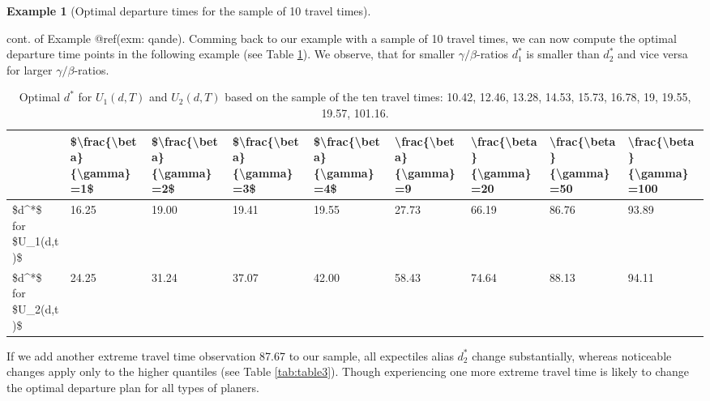 \documentclass[
]{article}
\theoremstyle{definition}
\theoremstyle{definition}
\newtheorem{example}{Example}[section]
\theoremstyle{definition}
\theoremstyle{definition}
\theoremstyle{remark}
\begin{document}
\begin{example}[Optimal departure times for the sample of 10 travel times]
\protect\hypertarget{exm:optd}{}\label{exm:optd}

cont. of Example @ref(exm: qande). Comming back to our example with a sample of 10 travel times, we can now compute the optimal departure time points in the following example (see Table \ref{tab:table1}). We observe, that for smaller \(\gamma/\beta\)-ratios \(d_1^*\) is smaller than \(d_2^*\) and vice versa for larger \(\gamma/\beta\)-ratios.

\begin{table}

\caption{\label{tab:table1}Optimal $d^*$ for $U_1(d,T)$ and $U_2(d,T)$ based on the sample of the ten travel times: 10.42, 12.46, 13.28, 14.53, 15.73, 16.78, 19, 19.55, 19.57, 101.16.}
\centering
\begin{tabular}[t]{l|l|l|l|l|l|l|l|l}
\hline
  & \$\textbackslash{}frac\{\textbackslash{}beta\}\{\textbackslash{}gamma\}=1\$ & \$\textbackslash{}frac\{\textbackslash{}beta\}\{\textbackslash{}gamma\}=2\$ & \$\textbackslash{}frac\{\textbackslash{}beta\}\{\textbackslash{}gamma\}=3\$ & \$\textbackslash{}frac\{\textbackslash{}beta\}\{\textbackslash{}gamma\}=4\$ & \textbackslash{}frac\{\textbackslash{}beta\}\{\textbackslash{}gamma\}=9 & \textbackslash{}frac\{\textbackslash{}beta\}\{\textbackslash{}gamma\}=20 & \textbackslash{}frac\{\textbackslash{}beta\}\{\textbackslash{}gamma\}=50 & \textbackslash{}frac\{\textbackslash{}beta\}\{\textbackslash{}gamma\}=100\\
\hline
\$d\textasciicircum{}*\$ for \$U\_1(d,t)\$ & 16.25 & 19.00 & 19.41 & 19.55 & 27.73 & 66.19 & 86.76 & 93.89\\
\hline
\$d\textasciicircum{}*\$ for \$U\_2(d,t)\$ & 24.25 & 31.24 & 37.07 & 42.00 & 58.43 & 74.64 & 88.13 & 94.11\\
\hline
\end{tabular}
\end{table}

If we add another extreme travel time observation 87.67 to our sample, all expectiles alias \(d^*_2\) change substantially, whereas noticeable changes apply only to the higher quantiles (see Table \ref{tab:table3}). Though experiencing one more extreme travel time is likely to change the optimal departure plan for all types of planers.

\begin{table}


\end{table}
\end{example}
\end{document}
